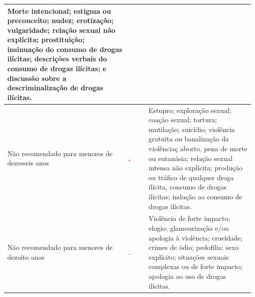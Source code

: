 \begin{table}[h!]
\begin{tabular}{p{4cm} p{1.5cm} p{9cm}}
				Morte intencional; estigma ou preconceito; nudez; erotização; vulgaridade; relação sexual não explícita; prostituição; insinuação do consumo de drogas ilícitas; descrições verbais do 	consumo de drogas ilícitas; e discussão sobre a descriminalização de drogas ilícitas.\\
		\hline
		Não recomendado para menores de dezesseis anos &\vfill \includegraphics[width=0.05\textwidth]{img/16anos.png}\vfill &
				Estupro; exploração sexual; coação sexual; tortura; mutilação; suicídio; violência gratuita ou banalização da violênciaç aborto, pena de morte ou eutanásia; relação sexual intensa não explícita; produção ou tráfico de qualquer droga ilícita, consumo de drogas ilícitas; indução ao consumo de drogas ilícitas.\\
		\hline
		Não recomendado para menores de dezoito anos &\vfill \includegraphics[width=0.05\textwidth]{img/18anos.png}\vfill &
				Violência de forte impacto; elogio; glamourização e/ou apologia à violência; crueldade; crimes de ódio; pedofilia; sexo explícito; situações sexuais complexas ou de forte impacto; apologia ao uso de drogas ilícitas.\\
		\hline
	\end{tabular}
\end{table}
